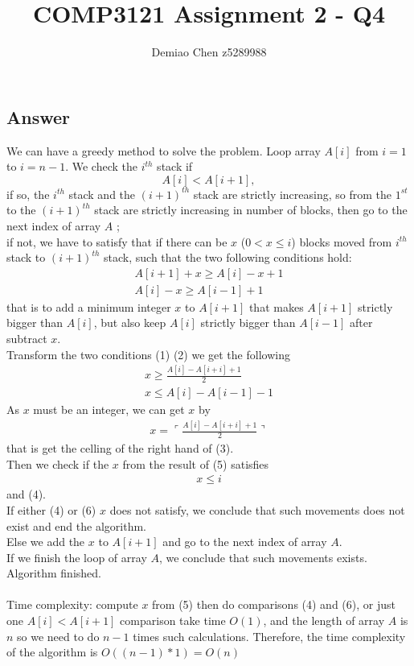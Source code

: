 \documentclass[12pt]{article}
\title{COMP3121 Assignment 2 - Q4}
\author{Demiao Chen z5289988}
\begin{document}
\maketitle
{}

\subsection*{Answer}
We can have a greedy method to solve the problem.
Loop array $A[i]$ from $i=1$ to $i=n-1$. We check the $i^{th}$ stack if $$
A[i] < A[i+1],
$$
if so, the $i^{th}$ stack and the $(i+1)^{th}$ stack are strictly increasing, so from the $1^{st}$ 
to the $(i+1)^{th}$ stack are strictly increasing in number of blocks, then go to the next index of array $A$ ;\\
if not, we have to satisfy that if there can be $x$ ($0 < x \leq i$) blocks moved from $i^{th}$ stack
to $(i+1)^{th}$ stack, such that the two following conditions hold:
\begin{align}\label{eq:1} 
    A[i+1] + x \geq  A[i] - x + 1\\
    A[i] - x \geq A[i-1]+ 1
\end{align}
that is to add a minimum integer $x$ to $A[i+1]$ that makes $A[i+1]$ strictly bigger than $A[i]$, but also keep $A[i]$
strictly bigger than $A[i-1]$ after subtract $x$.\\
Transform the two conditions (1) (2) we get the following
\begin{align}
   x \geq \frac{A[i]-A[i+i]+1}{2} \\
    x \leq A[i] - A[i-1] - 1
\end{align}
As $x$ must be an integer, we can get $x$ by 
\begin{align}
    x =\ulcorner\frac{A[i]-A[i+i]+1}{2}\urcorner 
\end{align}
that is get the celling of the right hand of (3).\\
Then we check if the $x$ from the result of (5) satisfies
\begin{align}
    x \leq i
\end{align}
and (4).\\
If either (4) or (6) $x$ does not satisfy, we conclude that such movements does not exist and 
end the algorithm.\\
Else we add the $x$ to $A[i+1]$ and go to the next index of array $A$.\\
If we finish the loop of array $A$, we conclude that such movements exists. Algorithm finished.\\\\
Time complexity: compute $x$ from (5) then do comparisons (4) and (6), or just one $
A[i] < A[i+1]
$ comparison take time $O(1)$, and the length of array
$A$ is $n$ so we need to do $n-1$ times such calculations. Therefore, the time complexity of
 the algorithm is $O((n-1)*1) = O(n)$ 
\end{document}
